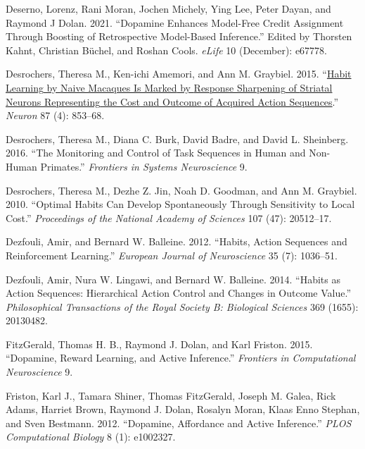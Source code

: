 \documentclass{article}
\newlength{\cslhangindent}
\newlength{\cslentryspacingunit} %
\newenvironment{CSLReferences}[2] %
 {%
  \setlength{\parindent}{0pt}
  \ifodd #1
  \let\oldpar\par
  \def\par{\hangindent=\cslhangindent\oldpar}
  \fi
  \setlength{\parskip}{#2\cslentryspacingunit}
 }%
 {}
\begin{document}
\begin{CSLReferences}{1}{0}
\leavevmode{}%
Deserno, Lorenz, Rani Moran, Jochen Michely, Ying Lee, Peter Dayan, and
Raymond J Dolan. 2021. {``Dopamine Enhances Model-Free Credit Assignment
Through Boosting of Retrospective Model-Based Inference.''} Edited by
Thorsten Kahnt, Christian Büchel, and Roshan Cools. \emph{eLife} 10
(December): e67778.

\leavevmode{}%
Desrochers, Theresa M., Ken-ichi Amemori, and Ann M. Graybiel. 2015.
{``\href{https://www.ncbi.nlm.nih.gov/pubmed/26291166}{Habit {Learning}
by {Naive Macaques Is Marked} by {Response Sharpening} of {Striatal
Neurons Representing} the {Cost} and {Outcome} of {Acquired Action
Sequences}}.''} \emph{Neuron} 87 (4): 853--68.

\leavevmode{}%
Desrochers, Theresa M., Diana C. Burk, David Badre, and David L.
Sheinberg. 2016. {``The {Monitoring} and {Control} of {Task Sequences}
in {Human} and {Non-Human Primates}.''} \emph{Frontiers in Systems
Neuroscience} 9.

\leavevmode{}%
Desrochers, Theresa M., Dezhe Z. Jin, Noah D. Goodman, and Ann M.
Graybiel. 2010. {``Optimal Habits Can Develop Spontaneously Through
Sensitivity to Local Cost.''} \emph{Proceedings of the National Academy
of Sciences} 107 (47): 20512--17.

\leavevmode{}%
Dezfouli, Amir, and Bernard W. Balleine. 2012. {``Habits, Action
Sequences and Reinforcement Learning.''} \emph{European Journal of
Neuroscience} 35 (7): 1036--51.

\leavevmode{}%
Dezfouli, Amir, Nura W. Lingawi, and Bernard W. Balleine. 2014.
{``Habits as Action Sequences: Hierarchical Action Control and Changes
in Outcome Value.''} \emph{Philosophical Transactions of the Royal
Society B: Biological Sciences} 369 (1655): 20130482.

\leavevmode{}%
FitzGerald, Thomas H. B., Raymond J. Dolan, and Karl Friston. 2015.
{``Dopamine, Reward Learning, and Active Inference.''} \emph{Frontiers
in Computational Neuroscience} 9.

\leavevmode{}%
Friston, Karl J., Tamara Shiner, Thomas FitzGerald, Joseph M. Galea,
Rick Adams, Harriet Brown, Raymond J. Dolan, Rosalyn Moran, Klaas Enno
Stephan, and Sven Bestmann. 2012. {``Dopamine, {Affordance} and {Active
Inference}.''} \emph{PLOS Computational Biology} 8 (1): e1002327.


\end{CSLReferences}
\end{document}
